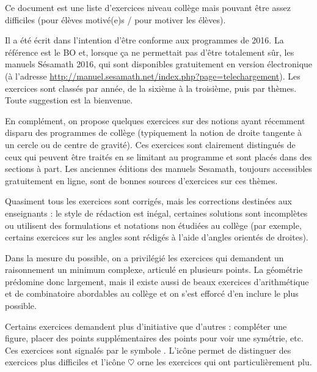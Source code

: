 Ce document est une liste d'exercices niveau collège mais pouvant être assez difficiles (pour élèves motivé(e)s / pour motiver les élèves).


Il a été écrit dans l'intention d'être conforme aux programmes de 2016. La référence est le BO et, lorsque ça ne permettait pas d'être totalement sûr, les manuels Sésamath 2016, qui sont disponibles gratuitement en version électronique (à l'adresse \url{http://manuel.sesamath.net/index.php?page=telechargement}). 
Les exercices sont classés par année, de la sixième à la troisième, puis par thèmes. Toute suggestion est la bienvenue.

En complément, on propose quelques exercices sur des notions ayant récemment disparu des programmes de collège (typiquement la notion de droite tangente à un cercle ou de centre de gravité). Ces exercices sont clairement distingués de ceux qui peuvent être traités en se limitant au programme et sont placés dans des sections à part. Les anciennes éditions des manuels Sesamath, toujours accessibles gratuitement en ligne, sont de bonnes sources d'exercices sur ces thèmes.
 
Quasiment tous les exercices sont corrigés, mais les corrections destinées aux enseignants : le style de rédaction est inégal, certaines solutions sont incomplètes ou utilisent des formulations et notations non étudiées au collège (par exemple, certains exercices sur les angles sont rédigés à l'aide d'angles orientés de droites).


Dans la mesure du possible, on a privilégié les exercices qui demandent un raisonnement un minimum complexe, articulé en plusieurs points. La géométrie prédomine donc largement, mais il existe aussi de beaux exercices d'arithmétique et de combinatoire abordables au collège et on s'est efforcé d'en inclure le plus possible. 


Certains exercices demandent plus d'initiative que d'autres : compléter une figure, placer des points supplémentaires des points pour voir une symétrie, etc. Ces exercices sont signalés par le symbole \faLightbulbO. L'icône \faCogs{} permet de distinguer des exercices plus difficiles et l'icône $\heartsuit$ orne les exercices qui ont particulièrement plu.




